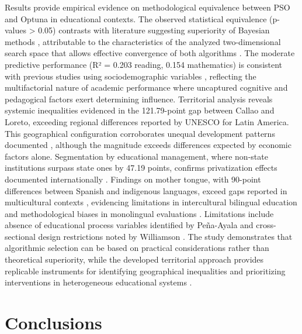 \documentclass[conference]{IEEEtran}
\begin{document}
Results provide empirical evidence on methodological equivalence between PSO and Optuna in educational contexts. The observed statistical equivalence (p-values > 0.05) contrasts with literature suggesting superiority of Bayesian methods \cite{bergstra2013making, akiba2019optuna}, attributable to the characteristics of the analyzed two-dimensional search space that allows effective convergence of both algorithms \cite{liu2020improved}. The moderate predictive performance (R² = 0.203 reading, 0.154 mathematics) is consistent with previous studies using sociodemographic variables \cite{romero2020educational, dutt2017systematic}, reflecting the multifactorial nature of academic performance where uncaptured cognitive and pedagogical factors exert determining influence. Territorial analysis reveals systemic inequalities evidenced in the 121.79-point gap between Callao and Loreto, exceeding regional differences reported by UNESCO \cite{unesco2021education} for Latin America. This geographical configuration corroborates unequal development patterns documented \cite{webb2013conexion}, although the magnitude exceeds differences expected by economic factors alone. Segmentation by educational management, where non-state institutions surpass state ones by 47.19 points, confirms privatization effects documented internationally \cite{kremer2013role}. Findings on mother tongue, with 90-point differences between Spanish and indigenous languages, exceed gaps reported in multicultural contexts \cite{garcia2017multilingual}, evidencing limitations in intercultural bilingual education and methodological biases in monolingual evaluations \cite{unesco2016ethnic}. Limitations include absence of educational process variables identified by Peña-Ayala \cite{pena2014educational} and cross-sectional design restrictions noted by Williamson \cite{williamson2020datafication}. The study demonstrates that algorithmic selection can be based on practical considerations rather than theoretical superiority, while the developed territorial approach provides replicable instruments for identifying geographical inequalities and prioritizing interventions in heterogeneous educational systems \cite{gonzalez2023edmcolombia}.

\section{Conclusions}
\end{document}
